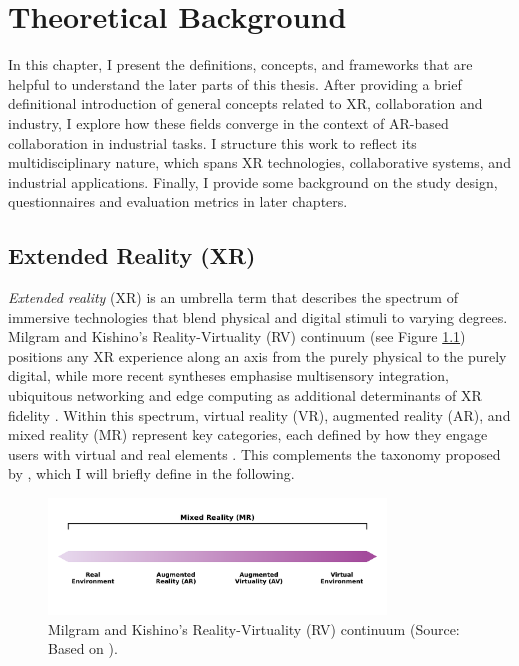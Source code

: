 \chapter{Theoretical Background}\label{chapter:background}
In this chapter, I present the definitions, concepts, and frameworks that are helpful to
understand the later parts of this thesis. After providing a brief definitional introduction of general concepts related to XR, collaboration and industry, I explore how these fields converge in the context of AR-based collaboration in industrial tasks.
I structure this work to reflect its multidisciplinary nature, which spans XR technologies, collaborative systems, and industrial applications. Finally, I provide some background on the study design, questionnaires and evaluation metrics in later chapters.

\section{Extended Reality (XR)}
\label{sec:xr}
\textit{Extended reality} (XR) is an umbrella term that describes the spectrum of immersive technologies that blend physical and digital stimuli to varying degrees. Milgram and Kishino's Reality-Virtuality (RV) continuum \cite{milgram1995augmented} (see Figure \ref{fig:rv-continuum}) positions any XR experience along an axis from the purely physical to the purely digital, while more recent syntheses emphasise multisensory integration, ubiquitous networking and edge computing as additional determinants of XR fidelity \cite{doerner2022xrTextbook}. Within this spectrum, virtual reality (VR), augmented reality (AR), and mixed reality (MR) represent key categories, each defined by how they engage users with virtual and real elements \cite{doerner2022xrTextbook}. This complements the taxonomy proposed by \cite{milgram1995augmented}, which I will briefly define in the following.

\begin{figure}[t!]
    \centering
    \includegraphics[width=0.8\textwidth]{assets/02/xr-cont.pdf}
    \caption{Milgram and Kishino's Reality-Virtuality (RV) continuum (Source: Based on \cite{milgram1995augmented}).}
    \label{fig:rv-continuum}
\end{figure}



